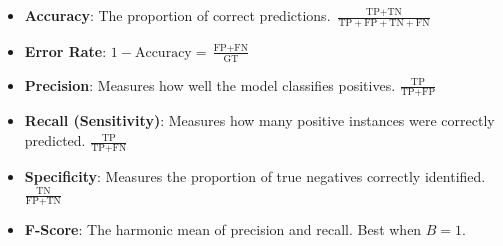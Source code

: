 \begin{itemize}
    \item \textbf{Accuracy}: The proportion of correct predictions. \(\frac{\text{TP} + \text{TN}}{\text{TP} + \text{FP} + \text{TN} + \text{FN}}\)
    \item \textbf{Error Rate}: \(1 - \text{Accuracy} = \frac{\text{FP} + \text{FN}}{\text{GT}}\)
    \item \textbf{Precision}: Measures how well the model classifies positives. \(\frac{\text{TP}}{\text{TP} + \text{FP}}\)
    \item \textbf{Recall (Sensitivity)}: Measures how many positive instances were correctly predicted. \(\frac{\text{TP}}{\text{TP} + \text{FN}}\)
    \item \textbf{Specificity}: Measures the proportion of true negatives correctly identified. \(\frac{\text{TN}}{\text{FP} + \text{TN}}\)
    \item \textbf{F-Score}: The harmonic mean of precision and recall. Best when \(B = 1\).
\end{itemize}

